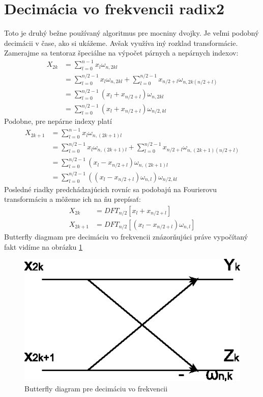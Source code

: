 \section{Decimácia vo frekvencii radix2}
Toto je druhý bežne používaný algoritmus pre mocniny dvojky. Je veľmi
podobný decimácii v čase, ako si ukážeme. Avšak využíva iný rozklad
transformácie. Zamerajme sa tentoraz  špeciálne na výpočet párnych a
nepárnych indexov:
\begin{equation}
    \begin{split}
    X_{2k} &= \sum_{l=0}^{n-1} x_l \omega_{n,2kl} \\
            &= \sum_{l=0}^{n/2-1} x_l \omega_{n,2kl} +
              \sum_{l=0}^{n/2-1} x_{n/2+l} \omega_{n, 2k(n/2 + l)} \\
            &= \sum_{l=0}^{n/2-1} (x_l + x_{n/2+l}) \omega_{n, 2kl} \\
            &= \sum_{l=0}^{n/2-1} (x_l + x_{n/2+l}) \omega_{n/2, kl} 
    \end{split}
\end{equation}
Podobne, pre nepárne indexy platí
\begin{equation}
    \begin{split}
    X_{2k+1} &= \sum_{l=0}^{n-1} x_l \omega_{n,(2k+1)l} \\
            &= \sum_{l=0}^{n/2-1} x_l \omega_{n,(2k+1)l} +
              \sum_{l=0}^{n/2-1} x_{n/2+l} \omega_{n, (2k+1)(n/2 + l)} \\
            &= \sum_{l=0}^{n/2-1} (x_l - x_{n/2+l}) \omega_{n, (2k+1)l} \\
            &= \sum_{l=0}^{n/2-1} ((x_l - x_{n/2+l})
              \omega_{n,l} )
            \omega_{n/2, kl}
    \end{split}
\end{equation}
Posledné riadky predchádzajúcich rovníc sa podobajú na Fourierovu
transformáciu a môžeme ich na ňu prepísať:
\begin{align}
    X_{2k} &= DFT_{n/2}[x_l + x_{n/2+l}] \\
    X_{2k+1} &= DFT_{n/2}[(x_l - x_{n/2+l}) \omega_{n,l}]
\end{align}
Butterfly diagmam pre decimáciu vo frekvencii 
znázorňujúci práve vypočítaný fakt
vidíme na obrázku \ref{fig:butterfly_dif}

\begin{figure}[htp]
    \centering
        \includegraphics{obrazky/algoritmy/butterfly_dif}
        \caption{Butterfly diagram pre decimáciu vo frekvencii}
    \label{fig:butterfly_dif}
\end{figure}


